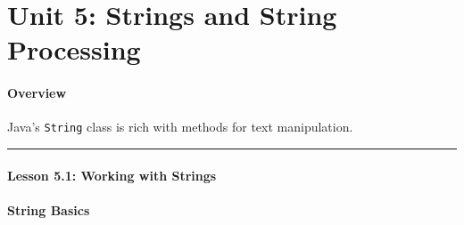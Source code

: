 \documentclass[
  justified,
  openright,
]{tufte-book}
\let\subsection\paragraph
\let\paragraph\paragraph
\let\subsection\paragraph
\let\paragraph\paragraph
\begin{document}
\newpage

\section{Unit 5: Strings and String
Processing}\label{unit-5-strings-and-string-processing-1}

\subsection{Overview}\label{overview-19}

Java's \texttt{String} class is rich with methods for text manipulation.

\begin{center}\rule{0.5\linewidth}{0.5pt}\end{center}

\subsection{Lesson 5.1: Working with
Strings}\label{lesson-5.1-working-with-strings-1}

\subsection{String Basics}\label{string-basics}
\end{document}
